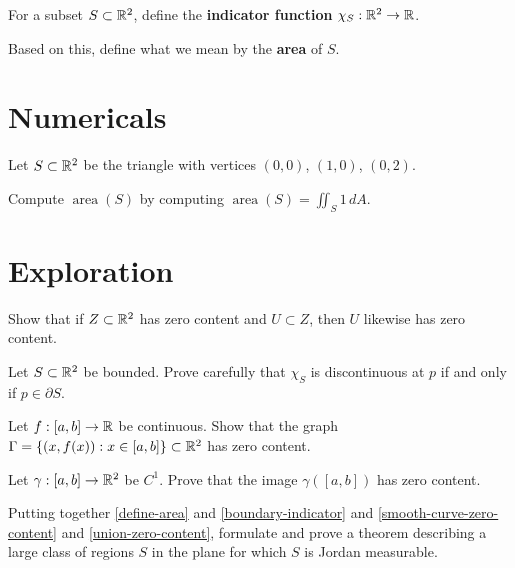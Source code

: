 \documentclass{homework}
\newcommand{\area}{\operatorname{area}}
\begin{document}
\begin{problem}\label{define-area}%
  For a subset $S \subset \mathbb{R}^2$, define the \textbf{indicator function} $\chi_S : \mathbb{R}^2 \to \mathbb{R}$.

  Based on this, define what we mean by the \textbf{area} of $S$.
\end{problem}

\section{Numericals}

\begin{problem}
  Let $S\subset\mathbb{R}^2$ be the triangle with vertices $(0,0)$, $(1,0)$, $(0,2)$.

  Compute $\area(S)$ by computing $\area(S)=\iint_S 1\,dA$.
\end{problem}

\section{Exploration}

\begin{problem}
  Show that if $Z\subset\mathbb{R}^2$ has zero content and $U\subset Z$, then $U$ likewise has zero content.
\end{problem}

\begin{problem}\label{boundary-indicator}%
  Let $S\subset\mathbb{R}^2$ be bounded. Prove carefully that $\chi_S$ is discontinuous at $p$ if and only if $p\in\partial S$.
\end{problem}

\begin{problem}\label{graph-zero-content}%
  Let $f:[a,b]\to\mathbb{R}$ be continuous.
  Show that the graph $\Gamma=\{(x,f(x)) : x\in[a,b]\}\subset\mathbb{R}^2$ has zero content.
\end{problem}

\begin{problem}\label{smooth-curve-zero-content}%
  Let $\gamma:[a,b]\to\mathbb{R}^2$ be $C^1$.   Prove that the image $\gamma([a,b])$ has zero content.
\end{problem}

\begin{problem}
  Putting together \ref{define-area} and \ref{boundary-indicator} and \ref{smooth-curve-zero-content} and \ref{union-zero-content}, formulate and prove a theorem describing a large class of regions $S$ in the plane for which $S$ is Jordan measurable.
\end{problem}
\end{document}
